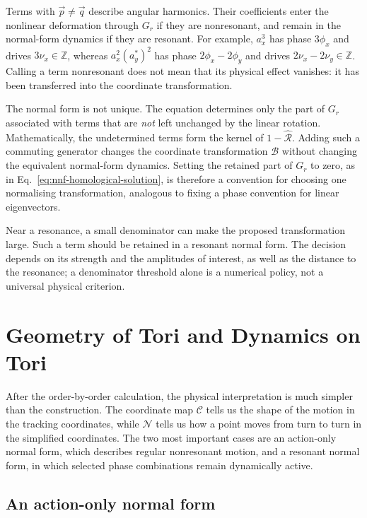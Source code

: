 Terms with $\vec p\ne\vec q$ describe angular harmonics.  Their coefficients
enter the nonlinear deformation through $G_r$ if they are nonresonant,
and remain in the normal-form dynamics if they are resonant.  For example,
$a_x^3$ has phase $3\phi_x$ and drives $3\nu_x\in\mathbb Z$, whereas
$a_x^2(a_y^*)^2$ has phase $2\phi_x-2\phi_y$ and drives
$2\nu_x-2\nu_y\in\mathbb Z$.  Calling a term nonresonant does not mean that
its physical effect vanishes: it has been transferred into the coordinate
transformation.

The normal form is not unique.  The equation determines only the part of
$G_r$ associated with terms that are \emph{not} left unchanged by the linear
rotation.  Mathematically, the undetermined terms form the kernel of
$1-\widehat{\mathcal R}$.  Adding such a commuting generator changes the
coordinate transformation $\mathcal B$ without changing the equivalent
normal-form dynamics.  Setting the retained part of $G_r$ to zero, as in
Eq.~\eqref{eq:nnf-homological-solution}, is therefore a convention for choosing
one normalising transformation, analogous to fixing a phase convention for
linear eigenvectors.

Near a resonance, a small denominator can make the proposed transformation
large.  Such a term should be retained in a resonant normal form.  The
decision depends on its strength and the amplitudes of interest, as well
as the distance to the resonance; a denominator threshold alone is a
numerical policy, not a universal physical criterion.



\section{Geometry of Tori and Dynamics on Tori}

After the order-by-order calculation, the physical interpretation is much
simpler than the construction.  The coordinate map $\mathcal C$ tells us the
shape of the motion in the tracking coordinates, while $\mathcal N$ tells us
how a point moves from turn to turn in the simplified coordinates.  The two
most important cases are an action-only normal form, which describes regular
nonresonant motion, and a resonant normal form, in which selected phase
combinations remain dynamically active.


\subsection{An action-only normal form}


